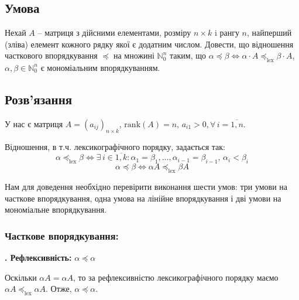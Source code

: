 \chapter{}
\label{chap:3}

\section{Умова}

Нехай $A$ -- матриця з дійсними елементами, розміру $n \times k$ i рангу $n$, найперший (зліва) елемент кожного
рядку якої є додатним числом. Довести, що відношення часткового впорядкування $\preceq$ на множині $\mathbb{N}_{0}^{n}$
таким, що $\alpha \preceq \beta \Leftrightarrow \alpha \cdot A \preceq_{\text{lex}} \beta \cdot A$,
$\alpha, \beta \in \mathbb{N}_{0}^{n}$ є мономіальним впорядкуванням.

\section{Розв'язання}

У нас є матриця $A = (a_{ij})_{n \times k}$, $\text{rank}(A) = n$, $a_{i1} > 0, \forall \, i = \overline{1, n}$. 

\noindent Відношення, в т.ч. лексикографічного порядку, задається так:
\begin{equation*}
    \alpha \preceq_{\text{lex}} \beta \Leftrightarrow \exists \, i \in \overline{1, k} : \alpha_{1} = \beta_{1}, \ldots, \alpha_{i-1} = \beta_{i-1}, \, \alpha_{i} < \beta_{i}
\end{equation*}
\begin{equation*}
    \alpha \preceq \beta \Leftrightarrow \alpha A \preceq_{\text{lex}} \beta A
\end{equation*}

Нам для доведення необхідно перевірити виконання шести умов: три умови на часткове впорядкування, одна умова на лінійне 
впорядкування і дві умови на мономіальне впорядкування.

\subsection{Часткове впорядкування:}

\textbf{. Рефлексивність:} $\alpha \preceq \alpha$

Оскільки $\alpha A = \alpha A$, то за рефлексивністю лексикографічного порядку маємо $\alpha A \preceq_{\text{lex}} \alpha A$. 
Отже, $\alpha \preceq \alpha$.

